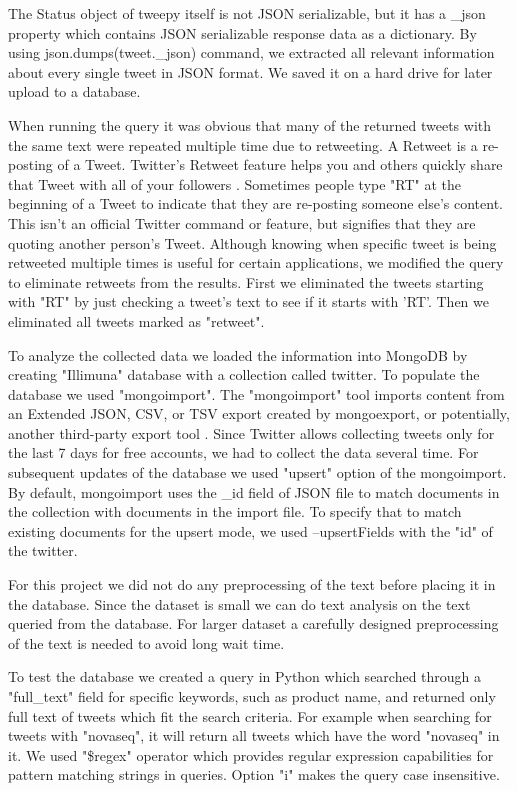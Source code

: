 \documentclass[10pt]{IEEEtran}
\begin{document}
The Status object of tweepy itself is not JSON serializable, but it has a \_json property which contains JSON serializable response data as a dictionary. By using json.dumps(tweet.\_json) command, we extracted all relevant information about every single tweet in JSON format. We saved it on a hard drive for later upload to a database. 

When running the query it was obvious that many of the returned tweets with the same text were repeated multiple time due to retweeting. A Retweet is a re-posting of a Tweet. Twitter's Retweet feature helps you and others quickly share that Tweet with all of your followers \cite{twitter}. Sometimes people type "RT" at the beginning of a Tweet to indicate that they are re-posting someone else's content. This isn't an official Twitter command or feature, but signifies that they are quoting another person's Tweet. Although knowing when specific tweet is being retweeted multiple times is useful for certain applications, we modified the query to eliminate retweets from the results. First we eliminated the tweets starting with "RT" by just checking a tweet's text to see if it starts with 'RT'. Then we eliminated all tweets marked as "retweet".


To analyze the collected data we loaded the information into MongoDB by creating "Illimuna" database with a collection called twitter. To populate the database we used "mongoimport". The "mongoimport" tool imports content from an Extended JSON, CSV, or TSV export created by mongoexport, or potentially, another third-party export tool \cite{mongodb}. Since Twitter allows collecting tweets only for the last 7 days for free accounts, we had to collect the data several time. For subsequent updates of the database we used "upsert" option of the mongoimport. By default, mongoimport uses the \_id field of JSON file to match documents in the collection with documents in the import file. To specify that to match existing documents for the upsert mode, we used --upsertFields with the "id" of the twitter.

For this project we did not do any preprocessing of the text before placing it in the database. Since the dataset is small we can do text analysis on the text queried from the database. For larger dataset a carefully designed preprocessing of the text is needed to avoid long wait time. 

To test the database we created a query in Python which searched through a "full\_text" field for specific keywords, such as product name, and returned only full text of tweets which fit the search criteria. For example when searching for tweets with "novaseq", it will return all tweets which have the word "novaseq" in it. We used "\$regex" operator which provides regular expression capabilities for pattern matching strings in queries. Option "i" makes the query case insensitive. 
\end{document}
